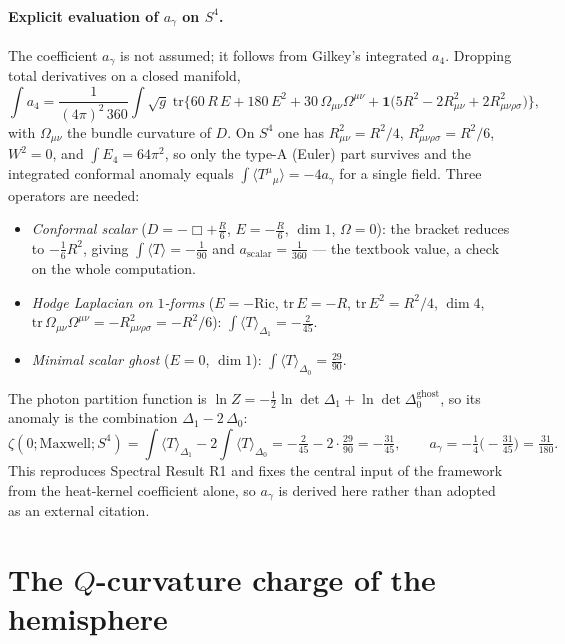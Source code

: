 \documentclass[11pt,a4paper]{article}
\theoremstyle{plain}
\theoremstyle{definition}
\theoremstyle{remark}
\newcommand{\ag}{a_\gamma}
\begin{document}
\paragraph{Explicit evaluation of $\ag$ on $S^4$.} The coefficient $\ag$ is not assumed; it
follows from Gilkey's integrated $a_4$. Dropping total derivatives on a closed manifold,
\[
\int a_4 = \frac{1}{(4\pi)^2\,360}\int\!\sqrt g\;\mathrm{tr}\Big\{60\,R\,E + 180\,E^2
+ 30\,\Omega_{\mu\nu}\Omega^{\mu\nu} + \mathbf{1}\big(5R^2 - 2R_{\mu\nu}^2 + 2R_{\mu\nu\rho\sigma}^2\big)\Big\},
\]
with $\Omega_{\mu\nu}$ the bundle curvature of $D$. On $S^4$ one has $R_{\mu\nu}^2 = R^2/4$,
$R_{\mu\nu\rho\sigma}^2 = R^2/6$, $W^2 = 0$, and $\int E_4 = 64\pi^2$, so only the type-A (Euler)
part survives and the integrated conformal anomaly equals $\int\langle T^\mu{}_\mu\rangle =
-4\ag$ for a single field. Three operators are needed:
\begin{itemize}[leftmargin=*,nosep]
\item \emph{Conformal scalar} ($D=-\Box + \tfrac{R}{6}$, $E=-\tfrac{R}{6}$, $\dim 1$, $\Omega=0$):
the bracket reduces to $-\tfrac16 R^2$, giving $\int\langle T\rangle = -\tfrac{1}{90}$ and
$a_{\mathrm{scalar}} = \tfrac{1}{360}$ --- the textbook value, a check on the whole computation.
\item \emph{Hodge Laplacian on $1$-forms} ($E = -\mathrm{Ric}$, $\mathrm{tr}\,E = -R$,
$\mathrm{tr}\,E^2 = R^2/4$, $\dim 4$, $\mathrm{tr}\,\Omega_{\mu\nu}\Omega^{\mu\nu} =
-R_{\mu\nu\rho\sigma}^2 = -R^2/6$): $\int\langle T\rangle_{\Delta_1} = -\tfrac{2}{45}$.
\item \emph{Minimal scalar ghost} ($E=0$, $\dim 1$): $\int\langle T\rangle_{\Delta_0} =
\tfrac{29}{90}$.
\end{itemize}
The photon partition function is $\ln Z = -\tfrac12\ln\det\Delta_1 + \ln\det\Delta_0^{\mathrm{ghost}}$,
so its anomaly is the combination $\Delta_1 - 2\,\Delta_0$:
\[
\zeta(0;\mathrm{Maxwell};S^4) = \int\langle T\rangle_{\Delta_1} - 2\int\langle T\rangle_{\Delta_0}
= -\tfrac{2}{45} - 2\cdot\tfrac{29}{90} = -\tfrac{31}{45},
\qquad \ag = -\tfrac14\Big(-\tfrac{31}{45}\Big) = \boxed{\tfrac{31}{180}.}
\]
This reproduces Spectral Result R1 and fixes the central input of the framework from the
heat-kernel coefficient alone, so $\ag$ is derived here rather than adopted as an external citation.

\section{The $Q$-curvature charge of the hemisphere}
\label{sec:qcharge}
\end{document}
